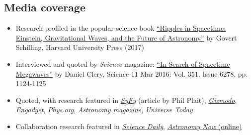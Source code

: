 \documentclass[11pt,letterpaper,sans]{moderncv}
\begin{document}
\subsection{Media coverage}
\begin{itemize}[leftmargin=8mm]
\item Research profiled in the popular-science book {\color{color1} \href{https://books.google.com/books/about/Ripples_in_Spacetime.html?id=YicuDwAAQBAJ&hl=en}{``Ripples in Spacetime: Einstein, Gravitational Waves, and the Future of Astronomy''}} by Govert Schilling, Harvard University Press (2017)
\item Interviewed and quoted by \textit{Science} magazine: {\color{color1} \href{http://science.sciencemag.org/content/351/6278/1124}{``In Search of Spacetime Megawaves''}} by Daniel Clery, Science  11 Mar 2016: Vol. 351, Issue 6278, pp. 1124-1125
\item Quoted, with research featured in {\color{color1} \href{https://www.syfy.com/syfywire/pulsars-black-holes-spacetime-center-of-the-solar-system}{\textit{SyFy}}} (article by Phil Plait), {\color{color1} \href{http://gizmodo.com/we-could-find-even-more-gravitational-waves-soon-with-p-1761021828}{\textit{Gizmodo}}}, {\color{color1} \href{https://www.engadget.com/2016/02/25/pulsars-gravitational-waves-black-holes/}{\textit{Engadget}}}, {\color{color1} \href{http://phys.org/news/2016-02-pulsar-web-low-frequency-gravitational.html}{\textit{Phys.org}}},  {\color{color1} \href{http://www.astronomy.com/news/2016/02/pulsar-web-could-detect-gravitational-waves}{\textit{Astronomy magazine}}}, {\color{color1} \href{http://www.universetoday.com/127562/the-future-of-gravitational-wave-astronomy-enhanced-ligo-pulsar-webs-space-interferometers-and-everything/}{\textit{Universe Today}}}
\item Collaboration research featured in {\color{color1} \href{https://www.sciencedaily.com/releases/2016/04/160405122609.htm}{\textit{Science Daily}}}, {\color{color1} \href{https://astronomynow.com/2016/04/06/gravitational-wave-search-provides-insights-into-galaxy-mergers/}{\textit{Astronomy Now} (online)}}
\end{itemize}

\end{document}
